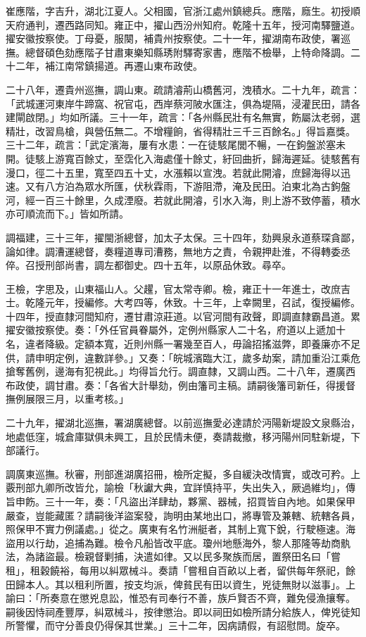 \begin{pinyinscope}
崔應階，字吉升，湖北江夏人。父相國，官浙江處州鎮總兵。應階，廕生。初授順天府通判，遷西路同知。雍正中，擢山西汾州知府。乾隆十五年，授河南驛鹽道。擢安徽按察使。丁母憂，服闋，補貴州按察使。二十一年，擢湖南布政使，署巡撫。總督碩色劾應階子甘肅東樂知縣琇附驛寄家書，應階不檢舉，上特命降調。二十二年，補江南常鎮揚道。再遷山東布政使。

二十八年，遷貴州巡撫，調山東。疏請濬荊山橋舊河，洩積水。二十九年，疏言：「武城運河東岸牛蹄窩、祝官屯，西岸蔡河陂水匯注，俱為堤隔，浸灌民田，請各建閘啟閉。」均如所議。三十一年，疏言：「各州縣民壯有名無實，飭屬汰老弱，選精壯，改習鳥槍，與營伍無二。不增糧餉，省得精壯三千三百餘名。」得旨嘉獎。三十二年，疏言：「武定濱海，屢有水患：一在徒駭尾閭不暢，一在鉤盤淤塞未開。徒駭上游寬百餘丈，至霑化入海處僅十餘丈，紆回曲折，歸海遲延。徒駭舊有漫口，徑二十五里，寬至四五十丈，水漲賴以宣洩。若就此開濬，庶歸海得以迅速。又有八方泊為眾水所匯，伏秋霖雨，下游阻滯，淹及民田。泊東北為古鉤盤河，經一百三十餘里，久成湮廢。若就此開濬，引水入海，則上游不致停蓄，積水亦可順流而下。」皆如所請。

調福建，三十三年，擢閩浙總督，加太子太保。三十四年，劾興泉永道蔡琛貪鄙，論如律。調漕運總督，奏糧道專司漕務，無地方之責，令親押赴淮，不得轉委丞倅。召授刑部尚書，調左都御史。四十五年，以原品休致。尋卒。

王檢，字思及，山東福山人。父趯，官太常寺卿。檢，雍正十一年進士，改庶吉士。乾隆元年，授編修。大考四等，休致。十三年，上幸闕里，召試，復授編修。十四年，授直隸河間知府，遷甘肅涼莊道。以官河間有政聲，即調直隸霸昌道。累擢安徽按察使。奏：「外任官員眷屬外，定例州縣家人二十名，府道以上遞加十名，違者降級。定額本寬，近則州縣一署幾至百人，毋論招搖滋弊，即養廉亦不足供，請申明定例，違數詳參。」又奏：「皖城濱臨大江，歲多劫案，請加重沿江乘危搶奪舊例，邊海有犯視此。」均得旨允行。調直隸，又調山西。二十八年，遷廣西布政使，調甘肅。奏：「各省大計舉劾，例由籓司主稿。請嗣後籓司新任，得援督撫例展限三月，以重考核。」

二十九年，擢湖北巡撫，署湖廣總督。以前巡撫愛必達請於沔陽新堤設文泉縣治，地處低窪，城倉庫獄俱未興工，且於民情未便，奏請裁撤，移沔陽州同駐新堤，下部議行。

調廣東巡撫。秋審，刑部進湖廣招冊，檢所定擬，多自緩決改情實，或改可矜。上覈刑部九卿所改皆允，諭檢「秋讞大典，宜詳慎持平，失出失入，厥過維均」，傳旨申飭。三十一年，奏：「凡盜出洋肆劫，夥黨、器械，招買皆自內地。如果保甲嚴查，豈能藏匿？請嗣後洋盜案發，詢明由某地出口，將專管及兼轄、統轄各員，照保甲不實力例議處。」從之。廣東有名竹洲艇者，其制上寬下銳，行駛極速。海盜用以行劫，追捕為難。檢令凡船皆改平底。瓊州地懸海外，黎人那隆等劫商骫法，為諸盜最。檢親督剿捕，決遣如律。又以民多聚族而居，置祭田名曰「嘗租」，租穀饒裕，每用以糾眾械斗。奏請「嘗租自百畝以上者，留供每年祭祀，餘田歸本人。其以租利所置，按支均派，俾貧民有田以資生，兇徒無財以滋事」。上諭曰：「所奏意在懲兇息訟，惟恐有司奉行不善，族戶賢否不齊，難免侵漁攘奪。嗣後因恃祠產豐厚，糾眾械斗，按律懲治。即以祠田如檢所請分給族人，俾兇徒知所警懼，而守分善良仍得保其世業。」三十二年，因病請假，有詔慰問。旋卒。


\end{pinyinscope}
